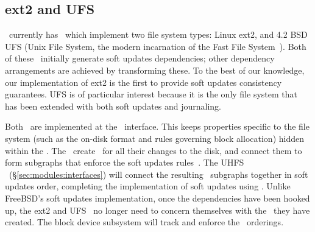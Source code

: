\begin{comment}
An example configuration taking advantage of this ability could be a file
system image mounted with an external journal, both of which are loopback block
devices stored on the root file system (which could use soft updates). The
journaled file system's ordering requirements are sent through the loopback
device as \chdescs, allowing dependency information to be maintained across
boundaries that might otherwise lose that information. In contrast, without
\chdescs\ and the ability to forward \chdescs\ through loopback devices, BSD
cannot express soft updates' consistency requirements through loopback devices.
Although the use of a loopback device is somewhat contrived in the example,
they are increasingly being used in conventional operating systems. For
instance, Mac OS X uses them in order to allow users to encrypt their home
directories.
\end{comment}

\subsection{ext2 and UFS}

\Kudos\ currently has \modules\ which implement two file system types: Linux
ext2, and 4.2 BSD UFS (Unix File System, the modern incarnation of the Fast File
System~\cite{mckusick84fast}).
%
Both of these \modules\ initially generate soft updates dependencies; other
dependency arrangements are achieved by transforming these.
%
%
To the best of our knowledge, our implementation of ext2 is the first to provide
soft updates consistency guarantees.
%
UFS is of particular interest because it is the only file system that has been
extended with both soft updates and journaling.~\cite{seltzer00journaling}
%

Both \modules\ are implemented at the \LFS\ interface. This keeps properties
specific to the file system (such as the on-disk format and rules governing
block allocation) hidden within the \module. The \modules\ create \chdescs\ for
all their changes to the disk, and connect them to form subgraphs that enforce
the soft updates rules~\cite{ganger00soft}. The UHFS \module\
(\S\ref{sec:modules:interfaces}) will connect the resulting \chdesc\ subgraphs
together in soft updates order, completing the implementation of soft updates
using \chdescs. Unlike FreeBSD's soft updates implementation, once the
dependencies have been hooked up, the ext2 and UFS \modules\ no longer need to
concern themselves with the \chdescs\ they have created. The block device
subsystem will track and enforce the \chdesc\ orderings.

